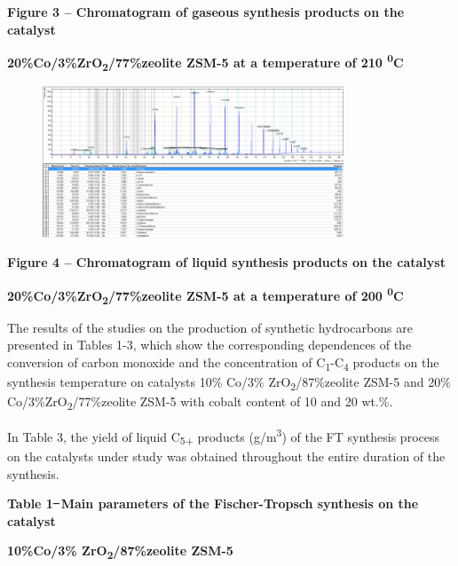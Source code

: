{\bfseries Figure 3 -- Chromatogram of gaseous synthesis products on the
catalyst}

{\bfseries 20\%Co/3\%ZrO\textsubscript{2}/77\%zeolite ZSM-5 at a
temperature of 210 \textsuperscript{0}C}

\begin{figure}[H]
	\centering
	\includegraphics[width=0.8\textwidth]{assets/1080}
	\caption*{}
\end{figure}

{\bfseries Figure 4 -- Chromatogram of liquid synthesis products on the
catalyst}

{\bfseries 20\%Co/3\%ZrO\textsubscript{2}/77\%zeolite ZSM-5 at a
temperature of 200 \textsuperscript{0}C}

The results of the studies on the production of synthetic hydrocarbons
are presented in Tables 1-3, which show the corresponding dependences of
the conversion of carbon monoxide and the concentration of
C\textsubscript{1}-C\textsubscript{4} products on the synthesis
temperature on catalysts 10\% Co/3\% ZrO\textsubscript{2}/87\%zeolite
ZSM-5 and 20\% Co/3\%ZrO\textsubscript{2}/77\%zeolite ZSM-5 with cobalt
content of 10 and 20 wt.\%.

In Table 3, the yield of liquid C\textsubscript{5+} products
(g/m\textsuperscript{3}) of the FT synthesis process on the catalysts
under study was obtained throughout the entire duration of the
synthesis.

{\bfseries Table 1 ̶ Main parameters of the Fischer-Tropsch synthesis on
the catalyst}

{\bfseries 10\%Co/3\% ZrO\textsubscript{2}/87\%zeolite ZSM-5}

